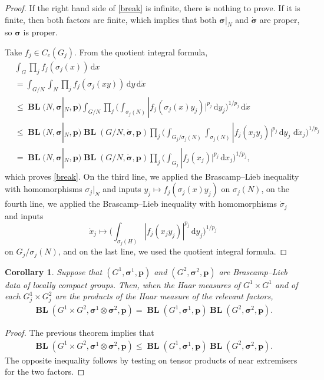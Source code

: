 \documentclass[12pt,twoside,a4paper]{amsart}
\newtheorem{cor}[thm]{Corollary}%
\theoremstyle{definition}
\theoremstyle{remark}
\numberwithin{equation}{section}
\newcommand{\wrt}[1]{\,\mathrm{d} #1}
\newcommand{\BL}{\operatorname{\mathbf{BL}}}
\newcommand{\bss}{\boldsymbol{\sigma}}
\newcommand{\bsds}{\boldsymbol{\dot\sigma}}
\newcommand{\bsp}{\boldsymbol{p}}
\begin{document}
\begin{proof}
If the right hand side of \eqref{break} is infinite, there is nothing to prove.
If it is finite, then both factors are finite, which implies that both $\bss|_N$ and $\bsds$ are proper, so $\bss$ is proper.

Take $f_j\in C_c(G_j)$.
From the quotient integral formula, 
\allowdisplaybreaks
\begin{align*}
&\int_{G} \prod_{j} f_j ( \sigma_j(x) )\wrt x\\
&= \int_{G/N}\int_{N} \prod_{j} f_j( \sigma_j(xy) ) \wrt y \wrt {\dot x} \\
&\leq\BL(N, \bss|_{N}, \bsp) \int_{G/N} \prod_{j}
\biggl( \int_{\sigma_j(N)} |f_j( \sigma_j(x) y_j ) |^{p_j} \wrt y_j \biggr) ^{1/p_j} \wrt {\dot x}  \\
&\leq \BL(N, \bss|_{N}, \bsp) \BL(G/N, \dot{\bss}, \bsp)
\prod_{j}
\biggl( \int_{G_j/\sigma_j(N)} \int_{\sigma_j(N)} |f_j( x_j y_j )|^{p_j} \wrt y_j  \,\wrt {\dot x}_j \biggr) ^{1/p_j} \\
&= \BL(N, \bss|_{N}, \bsp) \BL(G/N, \dot{\bss}, \bsp)
\prod_{j} \biggl( \int_{G_j} |f_j( x_j )|^{p_j} \wrt x_j \biggr) ^{1/p_j} ,
\end{align*}
which proves \eqref{break}.
On the third line, we applied the Brascamp--Lieb inequality with homo\-mor\-phisms $\sigma_j|_{N}$ and inputs $y_j \mapsto f_j(\sigma_j(x) y_j)$ on $\sigma_j(N)$, on the fourth line, we applied the Brascamp--Lieb inequality with homomorphisms $\dot\sigma_j$ and inputs
\[
\dot x_j \mapsto \biggl(\int_{\sigma_j(H)} |f_j(x_j y_j)|^{p_j} \wrt y_j\biggr)^{1/p_j}
\]
on $G_j/\sigma_j(N)$, and on the last line, we used the quotient integral formula.
\end{proof}

\begin{cor}\label{cor:breaking}
Suppose  that  $(G^1, \bss^1,\bsp)$ and $(G^2, \bss^2,\bsp)$ are Brascamp--Lieb data of locally compact groups.
Then, when the Haar measures of $G^1 \times G^1$ and of each $G^1_j \times G^2_j$  are the products of the Haar measure of the relevant factors, 
\begin{align}\label{break-product}
\BL(G^1\times G^2 , \bss^1 \otimes \bss^2, \bsp) =  \BL(G^1, \bss^1, \bsp) \BL(G^2, \bss^2, \bsp).       
\end{align}
\end{cor}

\begin{proof}
The previous theorem implies that 
\begin{align*}
\BL(G^1\times G^2 , \bss^1 \otimes \bss^2, \bsp) 
\leq  \BL(G^1, \bss^1, \bsp) \BL(G^2, \bss^2, \bsp).       
\end{align*}
The opposite inequality follows by testing on tensor products of near extremisers for the two factors.
\end{proof}
\end{document}
